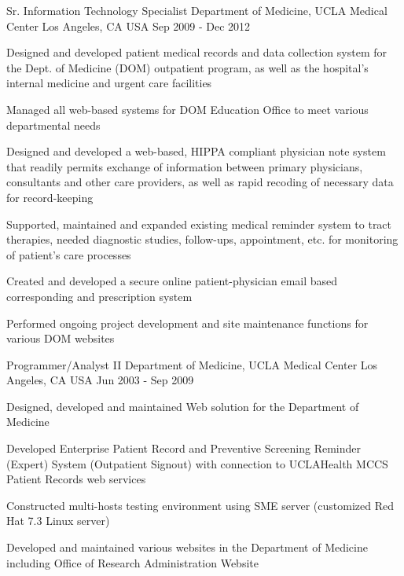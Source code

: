 \begin{cventries}
  \cventry
    {Sr. Information Technology Specialist} %
    {Department of Medicine, UCLA Medical Center} %
    {Los Angeles, CA USA} %
    {Sep 2009 - Dec 2012} %
    {
      \begin{cvitems} %
        \item {Designed and developed patient medical records and data collection system for the Dept. of Medicine (DOM) outpatient program, as well as the hospital's internal medicine and urgent care facilities}
        \item {Managed all web-based systems for DOM Education Office to meet various departmental needs}      
		 \item {Designed and developed a web-based, HIPPA compliant physician note system that readily permits exchange of information between primary physicians, consultants and other care providers, as well as rapid recoding of necessary data for record-keeping} 
		 \item{Supported, maintained and expanded existing medical reminder system to tract therapies, needed diagnostic studies, follow-ups, appointment, etc. for monitoring of patient's care processes}  
		 \item{Created and developed a secure online patient-physician email based corresponding and prescription system}
		 \item{Performed ongoing project development and site maintenance functions for various DOM websites}
      \end{cvitems}
    }

 \cventry
    {Programmer/Analyst II} %
    {Department of Medicine, UCLA Medical Center} %
    {Los Angeles, CA USA} %
    {Jun 2003 - Sep 2009} %
    {
      \begin{cvitems} %
        \item {Designed, developed and maintained Web solution for the Department of Medicine}
		 \item {Developed Enterprise Patient Record and Preventive Screening Reminder (Expert) System (Outpatient Signout) with connection to UCLAHealth MCCS Patient Records web services}
		   \item {Constructed multi-hosts testing environment using SME server (customized Red Hat 7.3 Linux server)}
		   \item {Developed and maintained various websites in the Department of Medicine including Office of Research Administration Website}
      \end{cvitems}
    }


\end{cventries}

